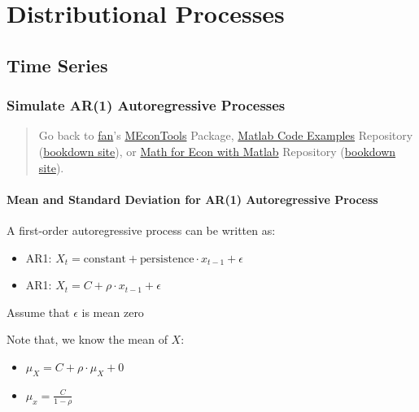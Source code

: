 \documentclass[
]{book}
\begin{document}
\hypertarget{distributional-processes}{%
\chapter{Distributional Processes}\label{distributional-processes}}

\hypertarget{time-series}{%
\section{Time Series}\label{time-series}}

\hypertarget{simulate-ar1-autoregressive-processes}{%
\subsection{Simulate AR(1) Autoregressive Processes}\label{simulate-ar1-autoregressive-processes}}

\begin{quote}
Go back to \href{http://fanwangecon.github.io/}{fan}'s \href{https://fanwangecon.github.io/MEconTools/}{MEconTools} Package, \href{https://fanwangecon.github.io/M4Econ/}{Matlab Code Examples} Repository (\href{https://fanwangecon.github.io/M4Econ/bookdown}{bookdown site}), or \href{https://fanwangecon.github.io/Math4Econ/}{Math for Econ with Matlab} Repository (\href{https://fanwangecon.github.io/Math4Econ/bookdown}{bookdown site}).
\end{quote}

\hypertarget{mean-and-standard-deviation-for-ar1-autoregressive-process}{%
\subsubsection{Mean and Standard Deviation for AR(1) Autoregressive Process}\label{mean-and-standard-deviation-for-ar1-autoregressive-process}}

A first-order autoregressive process can be written as:

\begin{itemize}
\item
  AR1:
  \(X_t =\textrm{constant}+\textrm{persistence}\cdot x_{t-1} +\epsilon\)
\item
  AR1: \(X_t =C+\rho \cdot x_{t-1} +\epsilon\)
\end{itemize}

Assume that \(\epsilon\) is mean zero

Note that, we know the mean of \(X\):

\begin{itemize}
\item
  \(\displaystyle \mu_X =C+\rho \cdot \mu_X +0\)
\item
  \(\displaystyle \mu_x =\frac{C}{1-\rho }\)
\end{itemize}
\end{document}
